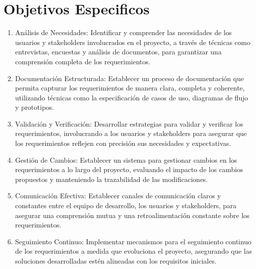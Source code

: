 \documentclass[11pt]{article}
\begin{document}
\section{Objetivos Especificos}
\begin{enumerate}
\item Análisis de Necesidades: Identificar y comprender las necesidades de los usuarios y stakeholders involucrados en el proyecto, a través de técnicas como entrevistas, encuestas y análisis de documentos, para garantizar una comprensión completa de los requerimientos.
\item Documentación Estructurada: Establecer un proceso de documentación que permita capturar los requerimientos de manera clara, completa y coherente, utilizando técnicas como la especificación de casos de uso, diagramas de flujo y prototipos.
\item Validación y Verificación: Desarrollar estrategias para validar y verificar los requerimientos, involucrando a los usuarios y stakeholders para asegurar que los requerimientos reflejen con precisión sus necesidades y expectativas.
\item Gestión de Cambios: Establecer un sistema para gestionar cambios en los requerimientos a lo largo del proyecto, evaluando el impacto de los cambios propuestos y manteniendo la trazabilidad de las modificaciones.
\item Comunicación Efectiva: Establecer canales de comunicación claros y constantes entre el equipo de desarrollo, los usuarios y stakeholders, para asegurar una comprensión mutua y una retroalimentación constante sobre los requerimientos.
\item Seguimiento Continuo: Implementar mecanismos para el seguimiento continuo de los requerimientos a medida que evoluciona el proyecto, asegurando que las soluciones desarrolladas estén alineadas con los requisitos iniciales. 
\end{enumerate}
\end{document}
